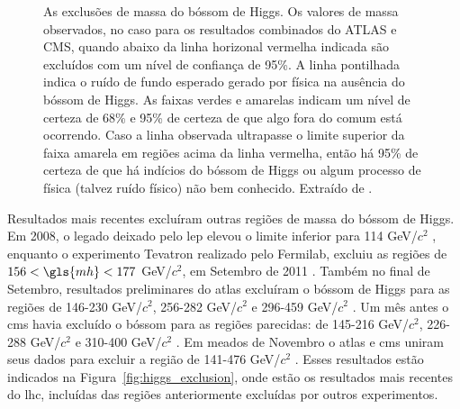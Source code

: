 \begin{figure}[t!]
\begin{center}
    \end{center}
\caption[Exclusões de massa do Higgs realizada pela combinação dos dados do
ATLAS e CMS. As exclusões de massa do Tevatron e LEP também estão indicadas.]{As exclusões de massa do bóssom de Higgs. Os valores de massa
observados, no caso para os resultados combinados do ATLAS e CMS, quando
abaixo da linha horizonal vermelha indicada são excluídos com um nível de
confiança de 95\%. A linha pontilhada indica o ruído de fundo esperado gerado
por física na ausência do bóssom de Higgs. As faixas verdes e amarelas indicam
um nível de certeza de 68\% e 95\% de certeza de que algo fora do comum está
ocorrendo. Caso a linha observada ultrapasse o limite superior da faixa amarela
em regiões acima da linha vermelha, então há 95\% de certeza de que há indícios
do bóssom de Higgs ou algum processo de física (talvez ruído físico) não bem
conhecido. Extraído de \cite{atlas_cms_higgs}.}
\end{figure}

Resultados mais recentes excluíram outras regiões de massa do bóssom de Higgs. Em 2008, 
o legado deixado pelo \gls{lep} elevou o limite inferior para 114 GeV/$c^2$
\cite{lep_higgs_2008}, enquanto o experimento Tevatron realizado pelo Fermilab, excluiu as
regiões de $156 < \gls{mh} < 177$ GeV/$c^2$, em Setembro de 2011
\cite{tevatron_higgs}. Também no final de Setembro, resultados preliminares do
\gls{atlas} excluíram o bóssom de Higgs para as regiões de 146-230 GeV/$c^2$, 256-282 GeV/$c^2$ 
e 296-459 GeV/$c^2$ \cite{atlas_higgs}. Um mês antes o \gls{cms} havia excluído o bóssom para
as regiões parecidas: de 145-216 GeV/$c^2$, 226-288 GeV/$c^2$ e 310-400 GeV/$c^2$
\cite{cms_higgs}. Em meados de Novembro o \gls{atlas} e \gls{cms} uniram seus
dados para excluir a região de 141-476 GeV/$c^2$ \cite{atlas_cms_higgs}. Esses
resultados estão indicados na Figura~\ref{fig:higgs_exclusion}, onde estão os
resultados mais recentes do \gls{lhc}, incluídas das regiões anteriormente
excluídas por outros experimentos.


